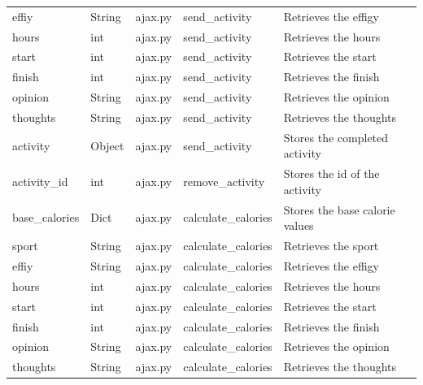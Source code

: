 \documentclass{article}[12pt,a4paper]
\begin{document}
\begin{table}[h]
\begin{tabular}{lllll}
effiy             & String        & ajax.py             & send\_activity            & Retrieves the effigy                    \\
hours             & int           & ajax.py             & send\_activity            & Retrieves the hours                     \\
start             & int           & ajax.py             & send\_activity            & Retrieves the start                     \\
finish            & int           & ajax.py             & send\_activity            & Retrieves the finish                    \\
opinion           & String        & ajax.py             & send\_activity            & Retrieves the opinion                   \\
thoughts          & String        & ajax.py             & send\_activity            & Retrieves the thoughts                  \\
activity          & Object        & ajax.py             & send\_activity            & Stores the completed activity           \\
activity\_id      & int           & ajax.py             & remove\_activity          & Stores the id of the activity           \\
base\_calories    & Dict          & ajax.py             & calculate\_calories       & Stores the base calorie values          \\
sport             & String        & ajax.py             & calculate\_calories       & Retrieves the sport                     \\
effiy             & String        & ajax.py             & calculate\_calories       & Retrieves the effigy                    \\
hours             & int           & ajax.py             & calculate\_calories       & Retrieves the hours                     \\
start             & int           & ajax.py             & calculate\_calories       & Retrieves the start                     \\
finish            & int           & ajax.py             & calculate\_calories       & Retrieves the finish                    \\
opinion           & String        & ajax.py             & calculate\_calories       & Retrieves the opinion                   \\
thoughts          & String        & ajax.py             & calculate\_calories       & Retrieves the thoughts                  \\

\end{tabular}
\end{table}
\end{document}
